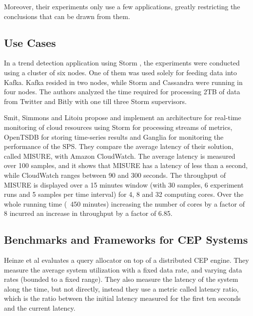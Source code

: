 \documentclass[ppgc,diss,english]{iiufrgs}
\begin{document}
Moreover, their experiments only use a few applications, greatly restricting the conclusions that can be drawn from them.


\subsection{Use Cases}

In a trend detection application using Storm \cite{chardonnens2013big}, the experiments were conducted using a cluster of six nodes. One of them was used solely for feeding data into Kafka. Kafka resided in two nodes, while Storm and Cassandra were running in four nodes. The authors analyzed the time required for processing 2TB of data from Twitter and Bitly with one till three Storm supervisors.

Smit, Simmons and Litoiu \cite{smit2013distributed} propose and implement an architecture for real-time monitoring of cloud resources using Storm for processing streams of metrics, OpenTSDB for storing time-series results and Ganglia for monitoring the performance of the SPS. They compare the average latency of their solution, called MISURE, with Amazon CloudWatch. The average latency is measured over 100 samples, and it shows that MISURE has a latency of less than a second, while CloudWatch ranges between 90 and 300 seconds. The throughput of MISURE is displayed over a 15 minutes window (with 30 samples, 6 experiment runs and 5 samples per time interval) for 4, 8 and 32 computing cores. Over the whole running time (~450 minutes) increasing the number of cores by a factor of 8 incurred an increase in throughput by a factor of 6.85.


\subsection{Benchmarks and Frameworks for CEP Systems}

Heinze et al \cite{heinzeelastic} evaluates a query allocator on top of a distributed CEP engine. They measure the average system utilization with a fixed data rate, and varying data rates (bounded to a fixed range). They also measure the latency of the system along the time, but not directly, instead they use a metric called latency ratio, which is the ratio between the initial latency measured for the first ten seconds and the current latency.
\end{document}

